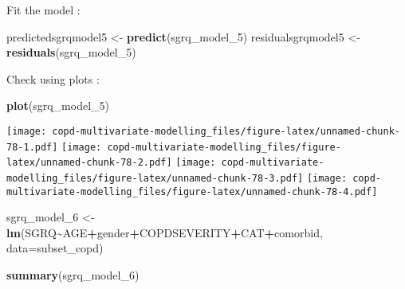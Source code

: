 \documentclass[
]{article}
\newenvironment{Shaded}{\begin{snugshade}}{\end{snugshade}}
\newcommand{\AttributeTok}[1]{\textcolor[rgb]{0.13,0.29,0.53}{#1}}
\newcommand{\FunctionTok}[1]{\textcolor[rgb]{0.13,0.29,0.53}{\textbf{#1}}}
\newcommand{\NormalTok}[1]{#1}
\newcommand{\OtherTok}[1]{\textcolor[rgb]{0.56,0.35,0.01}{#1}}
\newcommand{\SpecialCharTok}[1]{\textcolor[rgb]{0.81,0.36,0.00}{\textbf{#1}}}
\begin{document}
Fit the model :

\begin{Shaded}
\begin{Highlighting}[]
\NormalTok{predictedsgrqmodel5 }\OtherTok{\textless{}{-}} \FunctionTok{predict}\NormalTok{(sgrq\_model\_5)}
\NormalTok{residualsgrqmodel5 }\OtherTok{\textless{}{-}} \FunctionTok{residuals}\NormalTok{(sgrq\_model\_5)}
\end{Highlighting}
\end{Shaded}

Check using plots :

\begin{Shaded}
\begin{Highlighting}[]
\FunctionTok{plot}\NormalTok{(sgrq\_model\_5)}
\end{Highlighting}
\end{Shaded}

\texttt{[image: copd-multivariate-modelling\_files/figure-latex/unnamed-chunk-78-1.pdf]}
\texttt{[image: copd-multivariate-modelling\_files/figure-latex/unnamed-chunk-78-2.pdf]}
\texttt{[image: copd-multivariate-modelling\_files/figure-latex/unnamed-chunk-78-3.pdf]}
\texttt{[image: copd-multivariate-modelling\_files/figure-latex/unnamed-chunk-78-4.pdf]}

\begin{Shaded}
\begin{Highlighting}[]
\NormalTok{sgrq\_model\_6 }\OtherTok{\textless{}{-}} \FunctionTok{lm}\NormalTok{(SGRQ}\SpecialCharTok{\textasciitilde{}}\NormalTok{AGE}\SpecialCharTok{+}\NormalTok{gender}\SpecialCharTok{+}\NormalTok{COPDSEVERITY}\SpecialCharTok{+}\NormalTok{CAT}\SpecialCharTok{+}\NormalTok{comorbid, }\AttributeTok{data=}\NormalTok{subset\_copd)}
\end{Highlighting}
\end{Shaded}

\begin{Shaded}
\begin{Highlighting}[]
\FunctionTok{summary}\NormalTok{(sgrq\_model\_6)}
\end{Highlighting}
\end{Shaded}
\end{document}
